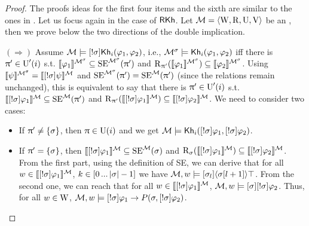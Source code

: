 \begin{proof}
The proofs ideas for the first four items and the sixth are similar to the ones in . Let us focus again in the case of $\axm{RKh}$.  
Let $\modults = \tup{\W, \R, \Unc, \V}$ be an \ults, then we prove below the two directions of the double implication.

$(\Rightarrow)$ Assume $\modults \models \srefbox{\plan} \khi(\varphi_1,\varphi_2)$, i.e.,  $\modults^\plan \models \khi(\varphi_1,\varphi_2)$ iff there is $\plans' \in \Unc'(i)$ s.t. $\truthset{\modults^\plan}{\varphi_1} \subseteq \stexec^{\modults^\plan}(\plans')$ and $\R_{\plans'}(\truthset{\modults^\plan}{\varphi_1}) \subseteq \truthset{\modults^\plan}{\varphi_2}$.
Using $\truthset{\modults^\plan}{\psi} = \truthset{\modults}{\srefbox{\plan} \psi}$ and $\stexec^{\modults^\plan}(\plans') = \stexec^\modults(\plans')$ (since the relations remain unchanged), this is equivalent to say that there is $\plans' \in \Unc'(i)$ s.t. $\truthset{\modults}{\srefbox{\plan} \varphi_1} \subseteq \stexec^\modults(\plans')$ and $\R_{\plans'}(\truthset{\modults}{\srefbox{\plan} \varphi_1}) \subseteq \truthset{\modults}{\srefbox{\plan} \varphi_2}$. We need to consider two cases:
\begin{itemize}
\item If $\plans' \neq \set{\plan}$, then $\plans \in \Unc(i)$ and we get $\modults \models \khi(\srefbox{\plan}\varphi_1,\srefbox{\plan}\varphi_2)$.
\item If $\plans' = \set{\plan}$, then $\truthset{\modults}{\srefbox{\plan}\varphi_1} \subseteq \stexec^\modults(\plan)$ and $\R_\plan(\truthset{\modults}{\srefbox{\plan}\varphi_1}) \subseteq \truthset{\modults}{\srefbox{\plan}\varphi_2}$.
From the first part, using the definition of SE, we can derive that for all $w \in \truthset{\modults}{\srefbox{\plan}\varphi_1}$, $k \in \intint{0}{\card{\plan}-1}$ we have $\modults,w \models \mlbox{\plan_l}\mldiam{\plan[l+1]}\top$.
From the second one, we can reach that for all $w \in \truthset{\modults}{\srefbox{\plan}\varphi_1}$, $\modults,w \models \mlbox{\plan} \srefbox{\plan}\varphi_2$.
Thus, for all $w \in \W$, $\modults,w \models \srefbox{\plan} \varphi_1 \ra P(\plan,\srefbox{\plan}\varphi_2)$.
\end{itemize}


\end{proof}
